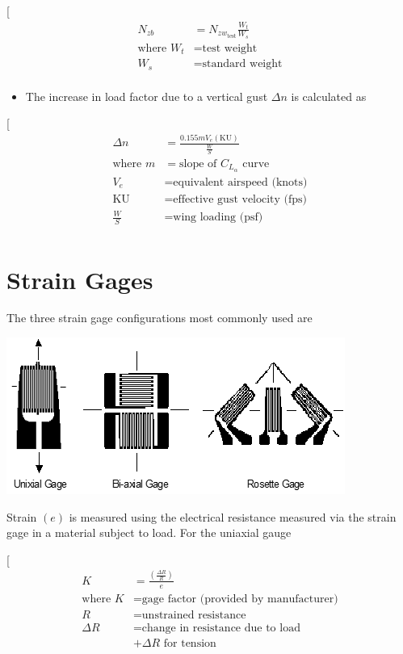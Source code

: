 \documentclass[
]{book}
\providecommand{\tightlist}{%
  \setlength{\itemsep}{0pt}\setlength{\parskip}{0pt}}
\begin{document}
{[}
\begin{align}
  N_{zb} &= N_{zw_{\text{test}}} \frac{W_t}{W_s} \\
  \text{where } W_t &= \text{test weight} \\
  W_s &= \text{standard weight} \\
  \end{align}

\begin{itemize}
\tightlist
\item
  The increase in load factor due to a vertical gust \(\Delta n\) is calculated as
\end{itemize}

{[}
\begin{align}
  \Delta n &= \frac{0.155 m V_e \left( \mathrm{KU} \right) }{\frac{W}{S}} \\
  \text{where } m &= \text{slope of } C_{L_{\alpha}} \text{ curve} \\
  V_e &= \text{equivalent airspeed (knots)} \\
  \mathrm{KU} &= \text{effective gust velocity (fps)} \\
  \frac{W}{S} &= \text{wing loading (psf)} \\
  \end{align}

\hypertarget{strain-gages}{%
\section{Strain Gages}\label{strain-gages}}

The three strain gage configurations most commonly used are

\includegraphics[width=4.36389in,height=2.02083in]{media/09/image4.png}

Strain \(\left( e \right)\) is measured using the electrical resistance measured via the strain gage in a material subject to load. For the uniaxial gauge

{[}
\begin{align}
  K &= \frac{ \left( \frac{\Delta R}{R} \right) }{e} \\
  \text{where } K &= \text{gage factor (provided by manufacturer)} \\
  R &= \text{unstrained resistance} \\
  \Delta R &= \text{change in resistance due to load} \\
  & + \Delta R \text{ for tension} \\
  \end{align}
\end{document}
